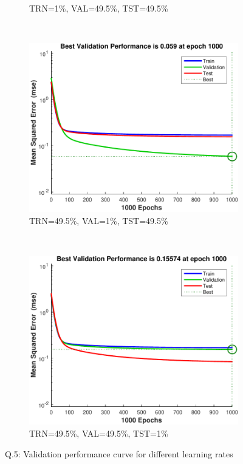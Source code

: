 \documentclass[12pt, a4paper]{article}
\begin{document}
\begin{figure}[htbp]
\begin{subfigure}[b]{0.42\textwidth}
			\caption{TRN=1\%, VAL=49.5\%, TST=49.5\%}
			\label{Q5-non-repr-training}
		\end{subfigure}
		\\
		\begin{subfigure}[b]{0.42\textwidth}
			\includegraphics[width=\textwidth]{Q5-non-repr-validation}
			\caption{TRN=49.5\%, VAL=1\%, TST=49.5\%}
			\label{Q5-non-repr-validation}
		\end{subfigure}
		~
		\begin{subfigure}[b]{0.42\textwidth}
			\includegraphics[width=\textwidth]{Q5-non-repr-test}
			\caption{TRN=49.5\%, VAL=49.5\%, TST=1\%}
			\label{Q5-non-repr-test}
		\end{subfigure}
	\caption{Q.5: Validation performance curve for different learning rates}
	\label{Q5}
\end{figure}
\end{document}
